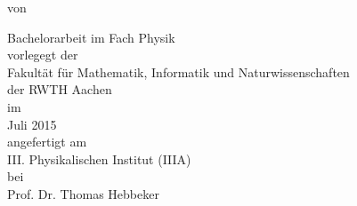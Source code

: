 \makeatletter
\begin{titlepage}
\begin{center}

\vspace{30mm}

\Huge \@title

\vspace{30mm}

\normalsize von \\

\vspace{5mm}

\LARGE \@author

\vspace{30mm}

\Large Bachelorarbeit im Fach Physik \\ \vspace{5mm}
\normalsize vorlegegt der \\
\Large Fakultät für Mathematik, Informatik und Naturwissenschaften \\
der RWTH Aachen \\ \vspace{5mm}
\normalsize im \\ \Large Juli 2015 \\ \vspace{5mm}
\normalsize angefertigt am \\ \Large III. Physikalischen Institut (IIIA) \\ \vspace{5mm}
\normalsize bei \\ \Large Prof. Dr. Thomas Hebbeker \vspace{5mm}

\end{center}
\end{titlepage}
\makeatother